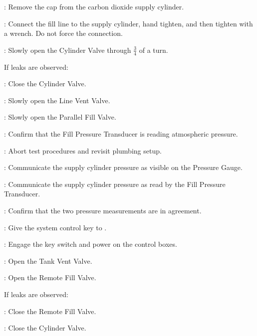 \begin{checklist}
\begin {checklist}
    \end {checklist}
    \item \primary{}: Remove the cap from the carbon dioxide supply cylinder.
    \item \primary{}: Connect the fill line to the supply cylinder, hand tighten, and then tighten with a wrench. Do not force the connection.
    \item \primary{}: Slowly open the Cylinder Valve through $\frac{3}{4}$ of a turn.
    \begin{checklist}[label=$\bullet$]
        \item If leaks are observed:
        \begin{checklist}
            \item \primary{}: Close the Cylinder Valve.
            \item \primary{}: Slowly open the Line Vent Valve.
            \item \primary{}: Slowly open the Parallel Fill Valve.
            \item \daq{}: Confirm that the Fill Pressure Transducer is reading atmospheric pressure.
            \item \ops{}: Abort test procedures and revisit plumbing setup.
        \end{checklist}
    \end{checklist}
    \item \primary{}: Communicate the supply cylinder pressure as visible on the Pressure Gauge.
    \item \daq{}: Communicate the supply cylinder pressure as read by the Fill Pressure Transducer.
    \item \daq{}: Confirm that the two pressure measurements are in agreement.
    \item \ops{}: Give the system control key to \control{}.
    \item \control{}: Engage the key switch and power on the control boxes.
    \item \control{}: Open the Tank Vent Valve.
    \item \control{}: Open the Remote Fill Valve.
    \begin{checklist}[label=$\bullet$]
        \item If leaks are observed:
        \begin{checklist}
            \item \control{}: Close the Remote Fill Valve.
            \item \primary{}: Close the Cylinder Valve.

\end{checklist}
\end{checklist}
\end{checklist}
